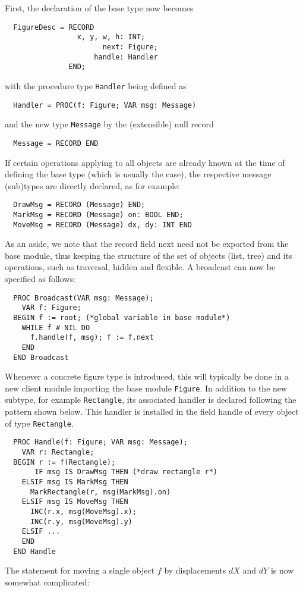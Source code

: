 First, the declaration of the base type now becomes
\begin{verbatim}
  FigureDesc = RECORD
                 x, y, w, h: INT;
                       next: Figure;
                     handle: Handler
               END;
\end{verbatim}
with the procedure type \verb|Handler| being defined as
\begin{verbatim}
  Handler = PROC(f: Figure; VAR msg: Message)
\end{verbatim}
and the new type \verb|Message| by the (extensible) null record
\begin{verbatim}
  Message = RECORD END
\end{verbatim}

If certain operations applying to all objects are already known at the time of defining the base type
(which is usually the case), the respective message (sub)types are directly declared, as for example:
\begin{verbatim}
  DrawMsg = RECORD (Message) END;
  MarkMsg = RECORD (Message) on: BOOL END;
  MoveMsg = RECORD (Message) dx, dy: INT END
\end{verbatim}
As an aside, we note that the record field next need not be exported from the base module, thus
keeping the structure of the set of objects (list, tree) and its operations, such as traversal, hidden
and flexible. A broadcast can now be specified as follows:
\begin{verbatim}
  PROC Broadcast(VAR msg: Message);
    VAR f: Figure;
  BEGIN f := root; (*global variable in base module*)
    WHILE f # NIL DO
      f.handle(f, msg); f := f.next
    END
  END Broadcast
\end{verbatim}
Whenever a concrete figure type is introduced, this will typically be done in a new client module
importing the base module \verb|Figure|. In addition to the new subtype, for example \verb|Rectangle|,
its associated handler is declared following the pattern shown below. This handler is installed in the
field handle of every object of type \verb|Rectangle|.
\begin{verbatim}
  PROC Handle(f: Figure; VAR msg: Message);
    VAR r: Rectangle;
  BEGIN r := f(Rectangle);
       IF msg IS DrawMsg THEN (*draw rectangle r*)
    ELSIF msg IS MarkMsg THEN
      MarkRectangle(r, msg(MarkMsg).on)
    ELSIF msg IS MoveMsg THEN
      INC(r.x, msg(MoveMsg).x);
      INC(r.y, msg(MoveMsg).y)
    ELSIF ...
    END
  END Handle
\end{verbatim}
The statement for moving a single object $f$ by displacements $dX$ and $dY$ is now somewhat complicated:
